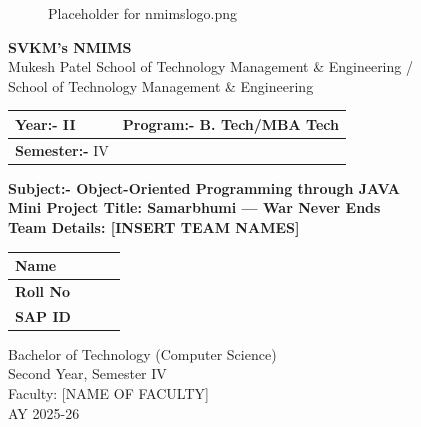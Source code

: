 \documentclass[a4paper,12pt]{article}
\begin{document}
\begin{center}
    \begin{figure}[h]
        \centering
        \caption*{Placeholder for nmimslogo.png}
    \end{figure}

    {\large \textbf{SVKM's NMIMS}} \\
    {\large Mukesh Patel School of Technology Management \& Engineering / \\ 
    School of Technology Management \& Engineering}

    \vspace{1cm}

    \renewcommand{\arraystretch}{1.5}
    \begin{tabular}{|l|l|}
        \hline
        \textbf{Year:-} II & \textbf{Program:-} B. Tech/MBA Tech \\ \hline
        \textbf{Semester:-} IV & \\ \hline
    \end{tabular}

    \vspace{1cm}

    {\Large \textbf{Subject:- Object-Oriented Programming through JAVA}} \\
    \vspace{0.5cm}
    {\large \textbf{Mini Project Title: Samarbhumi — War Never Ends}} \\
    {\large \textbf{Team Details: [INSERT TEAM NAMES]}}

    \vspace{1cm}

    \begin{tabular}{|l|p{3cm}|p{3cm}|p{3cm}|}
        \hline
        \textbf{Name} & & & \\ \hline
        \textbf{Roll No} & & & \\ \hline
        \textbf{SAP ID} & & & \\ \hline
    \end{tabular}

    \vspace{1.5cm}

    {\large Bachelor of Technology (Computer Science)} \\
    {Second Year, Semester IV} \\
    {Faculty: [NAME OF FACULTY]} \\
    {AY 2025-26}
\end{center}
\end{document}
